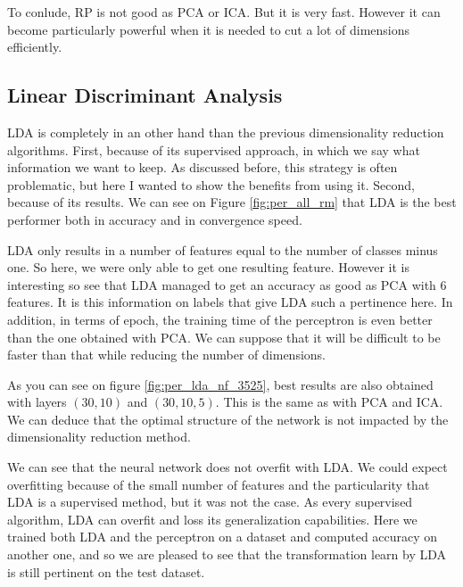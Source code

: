 \documentclass[twocolumn, 10pt]{article}
\begin{document}
			To conlude, RP is not good as PCA or ICA. But it is very fast. However it can become particularly powerful when it is needed to cut a lot of dimensions efficiently.
		\subsection{Linear Discriminant Analysis}
			LDA is completely in an other hand than the previous dimensionality reduction algorithms. First, because of its supervised approach, in which we say what information we want to keep. As discussed before, this strategy is often problematic, but here I wanted to show the benefits from using it. Second, because of its results. We can see on Figure \ref{fig:per_all_rm} that LDA is the best performer both in accuracy and in convergence speed.

			LDA only results in a number of features equal to the number of classes minus one. So here, we were only able to get one resulting feature. However it is interesting so see that LDA managed to get an accuracy as good as PCA with 6 features. It is this information on labels that give LDA such a pertinence here. In addition, in terms of epoch, the training time of the perceptron is even better than the one obtained with PCA. We can suppose that it will be difficult to be faster than that while reducing the number of dimensions.

			As you can see on figure \ref{fig:per_lda_nf_3525}, best results are also obtained with layers $(30, 10)$ and $(30, 10, 5)$. This is the same as with PCA and ICA. We can deduce that the optimal structure of the network is not impacted by the dimensionality reduction method.

			We can see that the neural network does not overfit with LDA. We could expect overfitting because of the small number of features and the particularity that LDA is a supervised method, but it was not the case. As every supervised algorithm, LDA can overfit and loss its generalization capabilities. Here we trained both LDA and the perceptron on a dataset and computed accuracy on another one, and so we are pleased to see that the transformation learn by LDA is still pertinent on the test dataset.
\end{document}
